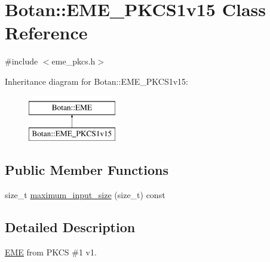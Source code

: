 \hypertarget{classBotan_1_1EME__PKCS1v15}{\section{Botan\-:\-:E\-M\-E\-\_\-\-P\-K\-C\-S1v15 Class Reference}
\label{classBotan_1_1EME__PKCS1v15}
}


{\ttfamily \#include $<$eme\-\_\-pkcs.\-h$>$}

Inheritance diagram for Botan\-:\-:E\-M\-E\-\_\-\-P\-K\-C\-S1v15\-:\begin{figure}[H]
\begin{center}
\leavevmode
\includegraphics[height=2.000000cm]{classBotan_1_1EME__PKCS1v15}
\end{center}
\end{figure}
\subsection*{Public Member Functions}
\begin{DoxyCompactItemize}
\item 
size\-\_\-t \hyperlink{classBotan_1_1EME__PKCS1v15_ab95f5296efc7b88956625ad705c5672b}{maximum\-\_\-input\-\_\-size} (size\-\_\-t) const 
\end{DoxyCompactItemize}


\subsection{Detailed Description}
\hyperlink{classBotan_1_1EME}{E\-M\-E} from P\-K\-C\-S \#1 v1. 

